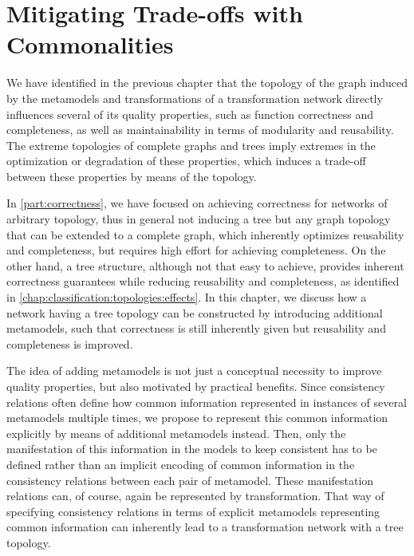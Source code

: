 \chapter{Mitigating Trade-offs with Commonalities 
}
\label{chap:improvement}

We have identified in the previous chapter that the topology of the graph induced by the metamodels and transformations of a transformation network directly influences several of its quality properties, such as function correctness and completeness, as well as maintainability in terms of modularity and reusability.
The extreme topologies of complete graphs and trees imply extremes in the optimization or degradation of these properties, which induces a trade-off between these properties by means of the topology.


In \autoref{part:correctness}, we have focused on achieving correctness for networks of arbitrary topology, thus in general not inducing a tree but any graph topology that can be extended to a complete graph, which inherently optimizes reusability and completeness, but requires high effort for achieving completeness.
On the other hand, a tree structure, although not that easy to achieve, provides inherent correctness guarantees while reducing reusability and completeness, as identified in \autoref{chap:classification:topologies:effects}.
In this chapter, we discuss how a network having a tree topology can be constructed by introducing additional metamodels, such that correctness is still inherently given but reusability and completeness is improved.

The idea of adding metamodels is not just a conceptual necessity to improve quality properties, but also motivated by practical benefits.
Since consistency relations often define how common information represented in instances of several metamodels multiple times, we propose to represent this common information explicitly by means of additional metamodels instead.
Then, only the manifestation of this information in the models to keep consistent has to be defined rather than an implicit encoding of common information in the consistency relations between each pair of metamodel.
These manifestation relations can, of course, again be represented by transformation.
That way of specifying consistency relations in terms of explicit metamodels representing common information can inherently lead to a transformation network with a tree topology.


